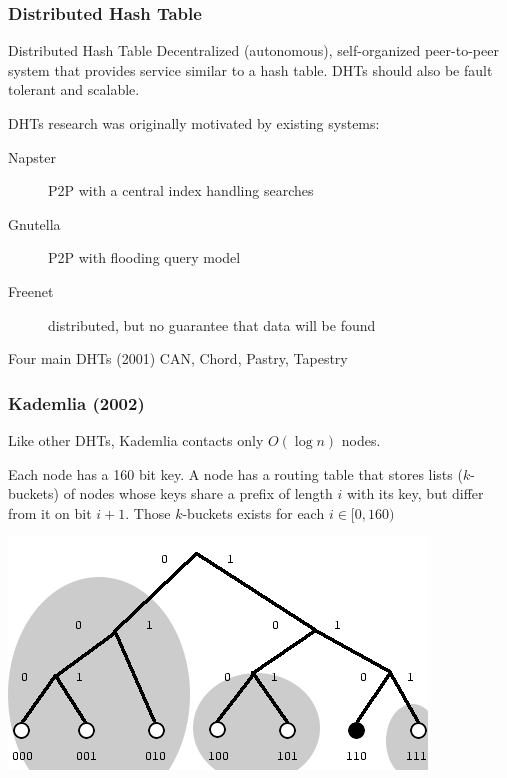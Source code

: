\documentclass{beamer}
\begin{document}
\begin{frame}
\frametitle{Distributed Hash Table}

\begin{block}{Distributed Hash Table}
Decentralized (autonomous), self-organized peer-to-peer system that provides service similar to a hash table.
DHTs should also be fault tolerant and scalable.
\end{block}

\pause
\begin{block}{}
DHTs research was originally motivated by existing systems:
\begin{description}
  \item[Napster] P2P with a central index handling searches
  \item[Gnutella] P2P with flooding query model
  \item[Freenet] distributed, but no guarantee that data will be found
\end{description}
\end{block}

\begin{block}{Four main DHTs (2001)}
CAN, Chord, Pastry, Tapestry
\end{block}

\end{frame}

\begin{frame}
\frametitle{Kademlia \cite{maymounkov2002kademlia} (2002)}
\begin{block}{}
Like other DHTs, Kademlia contacts only $O(\log n)$ nodes.
\end{block}

\pause

\begin{block}{}
Each node has a 160 bit key. A node has a routing table that stores
lists ($k$-buckets) of nodes whose keys share a prefix of length $i$ with its key,
but differ from it on bit $i+1$. Those $k$-buckets exists for each $i \in [0, 160)$
\end{block}

\begin{center}
\includegraphics[width=0.55\linewidth]{kademlia.png}
\end{center}

\end{frame}
\end{document}
